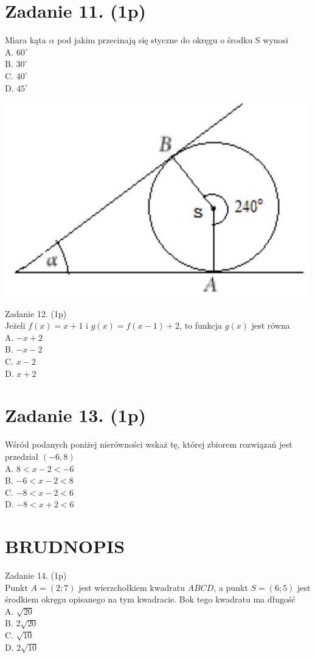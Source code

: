 \documentclass[10pt]{article}
\begin{document}
\section*{Zadanie 11. (1p)}
Miara kąta \(\alpha\) pod jakim przecinają się styczne do okręgu o środku S wynosi\\
A. \(60^{\circ}\)\\
B. \(30^{\circ}\)\\
C. \(40^{\circ}\)\\
D. \(45^{\circ}\)\\
\includegraphics[max width=\textwidth, center]{2024_11_21_cce9c7ad32a1dbcd58dag-04}

Zadanie 12. (1p)\\
Jeżeli \(f(x)=x+1\) i \(g(x)=f(x-1)+2\), to funkcja \(g(x)\) jest równa\\
A. \(-x+2\)\\
B. \(-x-2\)\\
C. \(x-2\)\\
D. \(x+2\)

\section*{Zadanie 13. (1p)}
Wśród podanych poniżej nierówności wskaż tę, której zbiorem rozwiązań jest przedział \((-6,8)\)\\
A. \(8<x-2<-6\)\\
B. \(-6<x-2<8\)\\
C. \(-8<x-2<6\)\\
D. \(-8<x+2<6\)

\section*{BRUDNOPIS}
Zadanie 14. (1p)\\
Punkt \(A=(2 ; 7)\) jest wierzchołkiem kwadratu \(A B C D\), a punkt \(S=(6 ; 5)\) jest środkiem okręgu opisanego na tym kwadracie. Bok tego kwadratu ma długość\\
A. \(\sqrt{20}\)\\
B. \(2 \sqrt{20}\)\\
C. \(\sqrt{10}\)\\
D. \(2 \sqrt{10}\)
\end{document}
